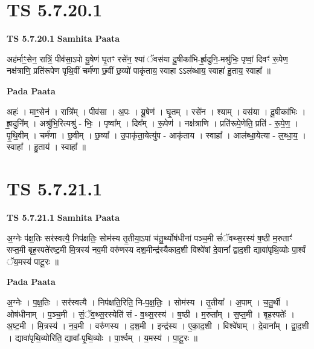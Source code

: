 \documentclass[17pt]{extarticle}
\begin{document}
\section*{ TS 5.7.20.1 }

\textbf{TS 5.7.20.1 } \newline
\textbf{Samhita Paata} \newline

अह॑र्माꣳ॒॒सेन॒ रात्रिं॒ पीव॑सा॒ऽपो यू॒षेण॑ घृ॒तꣳ रसे॑न॒ श्यां ॅवस॑या दू॒षीका॑भि-र्ह्रा॒दुनि॒-मश्रु॑भिः॒ पृष्वां॒ दिवꣳ॑ रू॒पेण॒ नक्ष॑त्राणि॒ प्रति॑रूपेण पृथि॒वीं चर्म॑णा छ॒वीं छ॒व्यो॑ पाकृ॑ताय॒ स्वाहा ऽऽल॑ब्धाय॒ स्वाहा॑ हु॒ताय॒ स्वाहा᳚ ॥ \newline

\textbf{Pada Paata} \newline

अहः॑ । माꣳ॒॒सेन॑ । रात्रि᳚म् । पीव॑सा । अ॒पः । यू॒षेण॑ । घृ॒तम् । रसे॑न । श्याम् । वस॑या । दू॒षीका॑भिः । ह्रा॒दुनि᳚म् । अश्रु॑भि॒रित्यश्रु॑ - भिः॒ । पृष्वा᳚म् । दिव᳚म् । रू॒पेण॑ । नक्ष॑त्राणि । प्रति॑रूपे॒णेति॒ प्रति॑ - रू॒पे॒ण॒ । पृ॒थि॒वीम् । चर्म॑णा । छ॒वीम् । छ॒व्या᳚ । उ॒पाकृ॑ता॒येत्यु॑प - आकृ॑ताय । स्वाहा᳚ । आल॑ब्धा॒येत्या - ल॒ब्धा॒य॒ । स्वाहा᳚ । हु॒ताय॑ । स्वाहा᳚ ॥  \newline




\section*{ TS 5.7.21.1 }

\textbf{TS 5.7.21.1 } \newline
\textbf{Samhita Paata} \newline

अ॒ग्नेः प॑क्ष॒तिः सर॑स्वत्यै॒ निप॑क्षतिः॒ सोम॑स्य तृ॒तीया॒ऽपां च॑तु॒र्थ्योष॑धीनां पञ्च॒मी सं॑ॅवथ्स॒रस्य॑ ष॒ष्ठी म॒रुताꣳ॑ सप्त॒मी बृह॒स्पते॑रष्ट॒मी मि॒त्रस्य॑ नव॒मी वरु॑णस्य दश॒मीन्द्र॑स्यैकाद॒शी विश्वे॑षां दे॒वानां᳚ द्वाद॒शी द्यावा॑पृथि॒व्योः पा॒र्श्वं ॅय॒मस्य॑ पाटू॒रः ॥ \newline

\textbf{Pada Paata} \newline

अ॒ग्नेः । प॒क्ष॒तिः । सर॑स्वत्यै । निप॑क्षति॒रिति॒ नि-प॒क्ष॒तिः॒ । सोम॑स्य । तृ॒तीया᳚ । अ॒पाम् । च॒तु॒र्थी । ओष॑धीनाम् । प॒ञ्च॒मी । सं॒ॅव॒थ्स॒रस्येति॑ सं - व॒थ्स॒रस्य॑ । ष॒ष्ठी । म॒रुता᳚म् । स॒प्त॒मी । बृह॒स्पतेः᳚ । अ॒ष्ट॒मी । मि॒त्रस्य॑ । न॒व॒मी । वरु॑णस्य । द॒श॒मी । इन्द्र॑स्य । ए॒का॒द॒शी । विश्वे॑षाम् । दे॒वाना᳚म् । द्वा॒द॒शी । द्यावा॑पृथि॒व्योरिति॒ द्यावा᳚-पृ॒थि॒व्योः । पा॒र्श्वम् । य॒मस्य॑ । पा॒टू॒रः ॥  \newline
\end{document}
